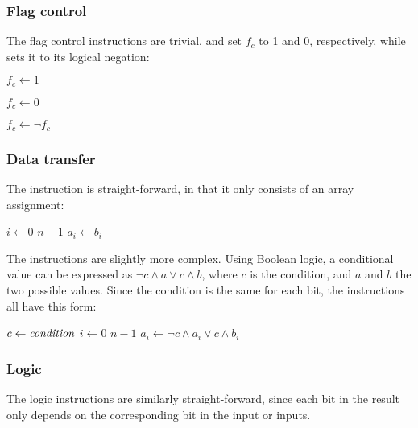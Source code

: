 \documentclass[a4paper,11pt]{kth-mag}
\renewcommand{\gets}{\leftarrow}
\newcommand{\AND}{\land}
\newcommand{\IOR}{\lor}
\newcommand{\NOT}{\lnot}
\begin{document}
\subsubsection{Flag control}

The flag control instructions are trivial.
 and  set $f_c$ to 1 and 0, respectively, while  sets it to its logical negation:

\begin{codebox}
\zi $f_c \gets 1$
\end{codebox}

\begin{codebox}
\zi $f_c \gets 0$
\end{codebox}

\begin{codebox}
\zi $f_c \gets \NOT f_c$
\end{codebox}

\subsubsection{Data transfer}

The  instruction is straight-forward, in that it only consists of an array assignment:

\begin{codebox}
\zi \For $i \gets 0$ \To $n-1$
\zi \Do
      $a_i \gets b_i$
    \End
\end{codebox}

The  instructions are slightly more complex.
Using Boolean logic, a conditional value can be expressed as $\NOT c \AND a \IOR c \AND b$, where $c$ is the condition, and $a$ and $b$ the two possible values.
Since the condition is the same for each bit, the  instructions all have this form:

\begin{codebox}
\zi $c \gets \id{condition}$
\zi \For $i \gets 0$ \To $n-1$
\zi \Do
      $a_i \gets \NOT c \AND a_i \IOR c \AND b_i$
    \End
\end{codebox}

\subsubsection{Logic}

The logic instructions are similarly straight-forward, since each bit in the result only depends on the corresponding bit in the input or inputs.
\end{document}
